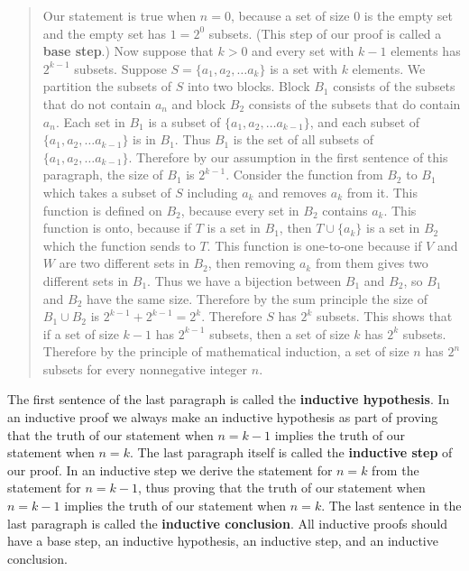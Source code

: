 \documentclass[10pt,]{book}
\newcommand{\terminology}[1]{\textbf{#1}}
\theoremstyle{plain}
\theoremstyle{definition}
\theoremstyle{definition}
\numberwithin{equation}{chapter}
\begin{document}
\begin{quote}\hypertarget{blockquote-7}{}
Our statement is true when \(n=0\), because a set of size 0 is the empty set and the empty set has \(1=2^0\) subsets. (This step of our proof is called a \terminology{base step}.) Now suppose that \(k>0\) and every set with \(k-1\) elements has \(2^{k-1}\) subsets.  Suppose \(S=\{a_1,a_2,\ldots a_k\}\) is a set with \(k\) elements. We partition the subsets of \(S\) into two blocks.  Block \(B_1\) consists of the subsets that do not contain \(a_n\) and block \(B_2\) consists of the subsets that do contain \(a_n\).  Each set in \(B_1\) is a subset of \(\{a_1,a_2,\ldots a_{k-1}\}\), and each subset of \(\{a_1,a_2, \ldots
a_{k-1}\}\) is in \(B_1\).  Thus \(B_1\) is the set of all subsets of \(\{a_1,a_2,\ldots a_{k-1}\}\).  Therefore by our assumption in the first sentence of this paragraph, the size of \(B_1\) is \(2^{k-1}\).  Consider the function from \(B_2\) to \(B_1\) which takes a subset of \(S\) including \(a_k\) and removes \(a_k\) from it.  This function is defined on \(B_2\), because every set in \(B_2\) contains \(a_k\).  This function is onto, because if \(T\) is a set in \(B_1\), then \(T\cup \{a_k\}\) is a set in \(B_2\) which the function sends to \(T\).  This function is one-to-one because if \(V\) and \(W\) are two different sets in \(B_2\), then removing \(a_k\) from them gives two different sets in \(B_1\).  Thus we have a bijection between \(B_1\) and \(B_2\), so \(B_1\) and \(B_2\) have the same size.  Therefore by the sum principle the size of \(B_1\cup B_2\) is \(2^{k-1} +2^{k-1}=2^k\).  Therefore \(S\) has \(2^k\) subsets.  This shows that if a set of size \(k-1\) has \(2^{k-1}\) subsets, then a set of size \(k\) has \(2^k\) subsets.  Therefore by the principle of mathematical induction, a set of size \(n\) has \(2^n\) subsets for every nonnegative integer \(n\).%
\end{quote}
The first sentence of the last paragraph is called the \terminology{inductive hypothesis}. In an inductive proof we always make an inductive hypothesis as part of proving that the truth of our statement when \(n=k-1\) implies the truth of our statement when \(n=k\). The last paragraph itself is called the \terminology{inductive step} of our proof. In an inductive step we derive the statement for \(n=k\) from the statement for \(n=k-1\), thus proving that the truth of our statement when \(n=k-1\) implies the truth of our statement when \(n=k\). The last sentence in the last paragraph is called the \terminology{inductive conclusion}. All inductive proofs should have a base step, an inductive hypothesis, an inductive step, and an inductive conclusion.%
\end{document}
